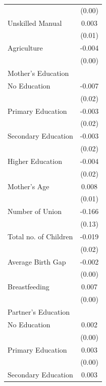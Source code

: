 \begin{longtable}{l*{1}{c}}
                    & (0.00) \\
\hspace{1em}Unskilled Manual & 0.003 \\
                    & (0.01) \\
\hspace{1em}Agriculture & -0.004 \\
                    & (0.00) \\
\multicolumn{2}{l}{Mother's Education} \\
\hspace{1em}No Education & -0.007 \\
                    & (0.02) \\
\hspace{1em}Primary Education & -0.003 \\
                    & (0.02) \\
\hspace{1em}Secondary Education & -0.003 \\
                    & (0.02) \\
\hspace{1em}Higher Education & -0.004 \\
                    & (0.02) \\
Mother's Age & 0.008 \\
                    & (0.01) \\
Number of Union & -0.166 \\
                    & (0.13) \\
Total no. of Children & -0.019 \\
                    & (0.02) \\
Average Birth Gap & -0.002\sym{***} \\
                    & (0.00) \\
Breastfeeding & 0.007 \\
                    & (0.00) \\
\multicolumn{2}{l}{Partner's Education} \\
\hspace{1em}No Education & 0.002 \\
                    & (0.00) \\
\hspace{1em}Primary Education & 0.003 \\
                    & (0.00) \\
\hspace{1em}Secondary Education & 0.003 \\

\end{longtable}
